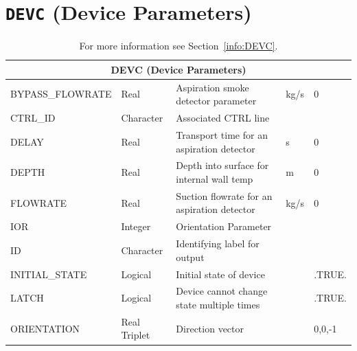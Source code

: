 \documentclass[11pt]{book}
\begin{document}
\vspace{\baselineskip}

\vfill


\section{\texorpdfstring{{\tt DEVC}}{DEVC} (Device Parameters)}

\hspace{1in}

\begin{table}[H]
\caption{For more information see Section~\ref{info:DEVC}.}\label{tbl:DEVC}
\noindent
\footnotesize
\begin{tabular*}{\textwidth}{@{\extracolsep{\fill}}|l|l|l|l|l|}
\hline
\multicolumn{5}{|c|}{{\ct DEVC} (Device Parameters)} \\ \hline \hline
{\ct BYPASS\_FLOWRATE} & Real            & Aspiration smoke detector parameter                              & kg/s  & 0       \\ \hline
{\ct CTRL\_ID}         & Character       & Associated {\ct CTRL} line                                       &       &         \\ \hline
{\ct DELAY}            & Real            & Transport time for an aspiration detector                        & s     & 0       \\ \hline
{\ct DEPTH}            & Real            & Depth into surface for internal wall temp                        & m     & 0       \\ \hline
{\ct FLOWRATE}         & Real            & Suction flowrate for an aspiration detector                      & kg/s  & 0       \\ \hline
{\ct IOR}              & Integer         & Orientation Parameter                                            &       &         \\ \hline
{\ct ID}               & Character       & Identifying label for output                                     &       &         \\ \hline
{\ct INITIAL\_STATE}   & Logical         & Initial state of device                                          &       & .TRUE.  \\ \hline
{\ct LATCH}            & Logical         & Device cannot change state multiple times                        &       & .TRUE.  \\ \hline
{\ct ORIENTATION}      & Real Triplet    & Direction vector                                                 &       & 0,0,-1  \\ \hline

\end{tabular*}
\end{table}
\end{document}
